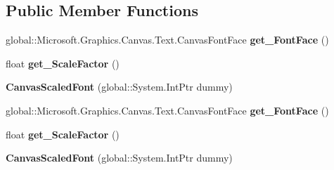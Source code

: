 \subsection*{Public Member Functions}
\begin{DoxyCompactItemize}
\item 
\mbox{\label{class_microsoft_1_1_graphics_1_1_canvas_1_1_text_1_1_canvas_scaled_font_ace99f2d30529dc2c60d0c11206e2aba2}} 
global\+::\+Microsoft.\+Graphics.\+Canvas.\+Text.\+Canvas\+Font\+Face {\bfseries get\+\_\+\+Font\+Face} ()
\item 
\mbox{\label{class_microsoft_1_1_graphics_1_1_canvas_1_1_text_1_1_canvas_scaled_font_a27b7b2da3a54ca18b66a84fe732b43dd}} 
float {\bfseries get\+\_\+\+Scale\+Factor} ()
\item 
\mbox{\label{class_microsoft_1_1_graphics_1_1_canvas_1_1_text_1_1_canvas_scaled_font_a54eee3f19978bcbc725a49e58a6e14d4}} 
{\bfseries Canvas\+Scaled\+Font} (global\+::\+System.\+Int\+Ptr dummy)
\item 
\mbox{\label{class_microsoft_1_1_graphics_1_1_canvas_1_1_text_1_1_canvas_scaled_font_ace99f2d30529dc2c60d0c11206e2aba2}} 
global\+::\+Microsoft.\+Graphics.\+Canvas.\+Text.\+Canvas\+Font\+Face {\bfseries get\+\_\+\+Font\+Face} ()
\item 
\mbox{\label{class_microsoft_1_1_graphics_1_1_canvas_1_1_text_1_1_canvas_scaled_font_a27b7b2da3a54ca18b66a84fe732b43dd}} 
float {\bfseries get\+\_\+\+Scale\+Factor} ()
\item 
\mbox{\label{class_microsoft_1_1_graphics_1_1_canvas_1_1_text_1_1_canvas_scaled_font_a54eee3f19978bcbc725a49e58a6e14d4}} 
{\bfseries Canvas\+Scaled\+Font} (global\+::\+System.\+Int\+Ptr dummy)
\item 
\mbox{\label{class_microsoft_1_1_graphics_1_1_canvas_1_1_text_1_1_canvas_scaled_font_ace99f2d30529dc2c60d0c11206e2aba2}} 

\end{DoxyCompactItemize}
